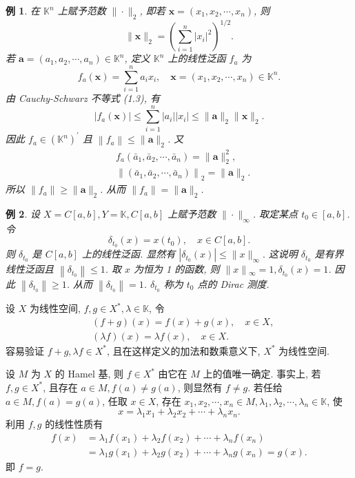 \documentclass[openany]{ctexbook}
\theoremstyle{kaiti}
\theoremstyle{normal}
\newtheorem{example}{例}[section]
\begin{document}
\begin{example}
在 $\mathbb{K}^n$ 上赋予范数 $\|\cdot\|_2$, 即若 $\boldsymbol{x}=\left(x_1, x_2, \cdots, x_n\right)$, 则
$$
\|\boldsymbol{x}\|_2=\left(\sum_{i=1}^n\left|x_{i}\right|^2\right)^{1 / 2}.
$$
若 $\boldsymbol{a}=\left(a_1, a_2, \cdots, a_n\right) \in \mathbb{K}^n$, 定义 $\mathbb{K}^n$ 上的线性泛函 $f_{a}$ 为
$$
f_{a}(\boldsymbol{x})=\sum_{i=1}^n a_{i} x_{i}, \quad \boldsymbol{x}=\left(x_1, x_2, \cdots, x_n\right) \in \mathbb{K}^n.
$$
由 Cauchy-Schwarz 不等式 (1.3), 有
$$
\left|f_{a}(\boldsymbol{x})\right| \leqslant \sum_{i=1}^n\left|a_{i}\right|\left|x_{i}\right| \leqslant\|\boldsymbol{a}\|_2\|\boldsymbol{x}\|_2.
$$
因此 $f_{a} \in\left(\mathbb{K}^n\right)^{\prime}$ 且 $\left\|f_{a}\right\| \leqslant\|\boldsymbol{a}\|_2$. 又
$$
\begin{aligned}
&f_{a}\left(\bar{a}_1, \bar{a}_2, \cdots, \bar{a}_n\right)=\|\boldsymbol{a}\|_2^2, \\
&\left\|\left(\bar{a}_1, \bar{a}_2, \cdots, \bar{a}_n\right)\right\|_2=\|\boldsymbol{a}\|_2.
\end{aligned}
$$
所以 $\left\|f_{a}\right\| \geqslant\|\boldsymbol{a}\|_2$. 从而 $\left\|f_{a}\right\|=\|\boldsymbol{a}\|_2$.
\end{example}

\begin{example}
设 $X=C[a, b], Y=\mathbb{K}, C[a, b]$ 上赋予范数 $\|\cdot\|_{\infty}$. 取定某点 $t_0 \in[a, b]$. 令
$$
\delta_{t_0}(x)=x\left(t_0\right), \quad x \in C[a, b].
$$
则 $\delta_{t_0}$ 是 $C[a, b]$ 上的线性泛函. 显然有
$\left|\delta_{t_0}(x)\right| \leqslant\|x\|_{\infty}.$
这说明 $\delta_{t_0}$ 是有界线性泛函且 $\left\|\delta_{t_0}\right\| \leqslant 1$. 取 $x$ 为恒为 1 的函数, 则 $\|x\|{ }_{\infty}=1, \delta_{t_0}(x)=1$. 因此 $\left\|\delta_{t_0}\right\| \geqslant 1$. 从而 $\left\|\delta_{t_0}\right\|=1$. $\delta_{t_0}$ 称为 $t_0$ 点的 Dirac 测度.
\end{example}

设 $X$ 为线性空间, $f, g \in X^{*}, \lambda \in \mathbb{K}$, 令
$$
\begin{aligned}
&(f+g)(x)=f(x)+g(x), \quad x \in X, \\
&(\lambda f)(x)=\lambda f(x), \quad x \in X.
\end{aligned}
$$
容易验证 $f+g, \lambda f \in X^{*}$, 且在这样定义的加法和数乘意义下, $X^{*}$ 为线性空间.

设 $M$ 为 $X$ 的 Hamel 基, 则 $f \in X^{*}$ 由它在 $M$ 上的值唯一确定. 事实上, 若 $f, g \in X^{*}$, 且存在 $a \in M, f(a) \neq g(a)$, 则显然有 $f \neq g$. 若任给 $a \in M, f(a)=g(a)$, 任取 $x \in X$, 存在 $x_1, x_2, \cdots, x_n \in M, \lambda_1, \lambda_2, \cdots, \lambda_n \in \mathbb{K}$, 使
$$
x=\lambda_1 x_1+\lambda_2 x_2+\cdots+\lambda_n x_n.
$$
利用 $f, g$ 的线性性质有
$$
\begin{aligned}
f(x) &=\lambda_1 f\left(x_1\right)+\lambda_2 f\left(x_2\right)+\cdots+\lambda_n f\left(x_n\right) \\
&=\lambda_1 g\left(x_1\right)+\lambda_2 g\left(x_2\right)+\cdots+\lambda_n g\left(x_n\right)=g(x).
\end{aligned}
$$
即 $f=g$.
\end{document}
